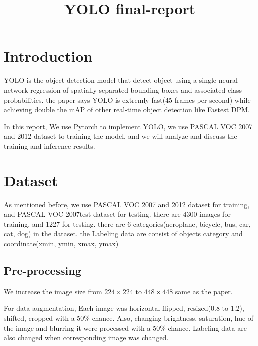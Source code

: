 \documentclass[extendedabs]{bmvc2k}
\begin{document}
\title{YOLO final-report}

 
\maketitle
\noindent

\section{Introduction}
YOLO\cite{yolopaper} is the object detection model that detect object using a single neural-network regression of spatially separated bounding boxes and associated class probabilities. the paper\cite{yolopaper} says YOLO is extremly fast(45 frames per second) while achieving double the mAP of other real-time object detection like Fastest DPM\cite{fastestdpm}.

In this report, We use Pytorch to implement YOLO, we use PASCAL VOC 2007 and 2012\cite{pascalvoc} dataset to training the model, and we will analyze and discuss the training and inference results.

\section{Dataset}
As mentioned before, we use PASCAL VOC 2007 and 2012\cite{pascalvoc} dataset for training, and PASCAL VOC 2007test dataset for testing. there are 4300 images for training, and 1227 for testing. there are 6 categories(aeroplane, bicycle, bus, car, cat, dog) in the dataset. the Labeling data are consist of objects category and coordinate(xmin, ymin, xmax, ymax)

\subsection{Pre-processing}
We increase the image size from $224\times224$ to $448\times448$ same as the paper.\cite{yolopaper}

For data augmentation, Each image was horizontal flipped, resized(0.8 to 1.2), shifted, cropped with a 50\% chance. Also, changing brightness, saturation, hue of the image and blurring it were processed with a 50\% chance. Labeling data are also changed when corresponding image was changed.
\end{document}
